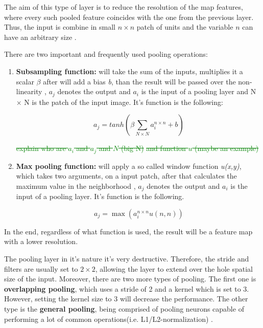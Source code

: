 The aim of this type of layer is to reduce the resolution of the map features, where every such pooled feature coincides with the one from the previous layer. Thus, the input is combine in small $n \times n$ patch of units and the variable $n$ can have an arbitrary size \cite{IntroCNN,EvalPooling}. \par

There are two important and frequently used pooling operations: 
\begin{enumerate}
    \item \textbf{Subsampling function:} will take the sum of the inputs, multiplies it a scalar \ensuremath{\beta} after will add a bias \textit{b}, than the result will be passed over the non-linearity \cite{EvalPooling}, $a_j$ denotes the output and $a_i$ is the input of a pooling layer and N $\times$ N is the patch of the input image. It's function is the following:
        \begin{center}
            \begin{equation}
                a_j= tanh(\ensuremath{\beta} \sum_{N \times N} a_{i}^{\textit{$n\times n$}} + b)
            \end{equation}
        \end{center}
        
    \textcolor{green}{\sout{explain who are $a_i$ and $a_j$ and $N$ (big N)} \sout{and function $u$ (maybe an example)}}
    
    \item \textbf{Max pooling function:} will apply a so called window function \textit{u(x,y)}, which takes two arguments, on a input patch, after that calculates the maximum value in the neighborhood \cite{EvalPooling}, $a_j$ denotes the output and $a_i$ is the input of a pooling layer. It's function is the following.
        \begin{center}
            \begin{equation} \label{eq:max}
               a_j = \max(a_{i}^{\textit{$n\times n$}} u(n,n))
            \end{equation}
        \end{center}
\end{enumerate}
\par
In the end, regardless of what function is used, the result will be a feature map with a lower resolution. \par

The pooling layer in it's nature it's very destructive. Therefore, the stride and filters are usually set to \textit{$2\times2$}, allowing the layer to extend over the hole spatial size of the input. Moreover, there are two more types of pooling. The first one is  \textbf{overlapping pooling}, which uses a stride of 2 and a kernel which is set to 3. However, setting the kernel size to 3 will decrease the performance. The other type is the \textbf{general pooling}, being comprised of pooling neurons capable of performing a lot of common operations(i.e. L1/L2-normalization) \cite{IntroCNN}. 